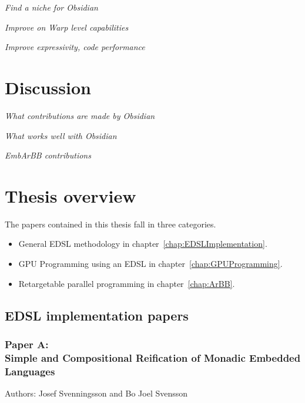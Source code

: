 \documentclass[a4paper]{book}
\newcommand{\paperA}{Paper A}
\newcommand{\paperATitle}{Simple and Compositional Reification of Monadic Embedded Languages}
\begin{document}
\noindent\emph{Find a niche for Obsidian} 

\noindent\emph{Improve on Warp level capabilities} 

\noindent\emph{Improve expressivity, code performance} 

\section{Discussion} 

\noindent\emph{What contributions are made by Obsidian} 

\noindent\emph{What works well with Obsidian}

\noindent\emph{EmbArBB contributions} 

\section{Thesis overview} 


The papers contained in this thesis fall in three categories. 
\begin{itemize} 
\item General EDSL methodology in chapter~\ref{chap:EDSLImplementation}. 
\item GPU Programming using an EDSL in chapter~\ref{chap:GPUProgramming}. 
\item Retargetable parallel programming in chapter~\ref{chap:ArBB}. 
\end{itemize} 

\subsection{EDSL implementation papers} 

\subsubsection{\paperA: \\ \paperATitle} 

Authors: Josef Svenningsson and Bo Joel Svensson 

\vspace{5mm}
\end{document}
